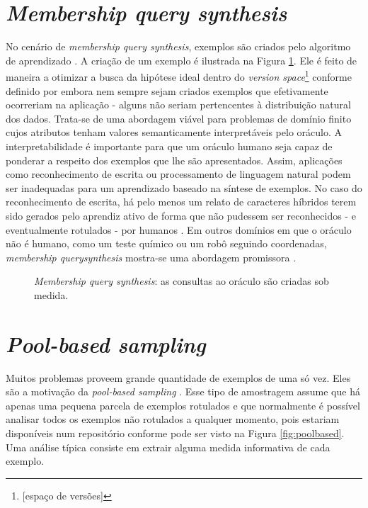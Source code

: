 \section*{\textit{Membership query synthesis}}

No cenário de \textit{membership query synthesis}, exemplos são criados pelo
algoritmo de aprendizado \citep{angluin1988queries}.
A criação de um exemplo é ilustrada na Figura \ref{fig:memquerysyn}.
Ele é feito de maneira a otimizar a busca da hipótese ideal dentro do
\textit{version space}\footnote{[espaço de versões]} conforme definido por
\cite{mitchell1997machine} embora nem
sempre sejam criados exemplos que efetivamente ocorreriam na aplicação - alguns não seriam
pertencentes à distribuição natural dos dados.
Trata-se de uma abordagem viável para problemas de domínio finito cujos atributos tenham valores
semanticamente interpretáveis pelo oráculo.
A interpretabilidade é importante para que um oráculo humano seja capaz de ponderar a respeito
dos
exemplos que lhe são apresentados.
Assim, aplicações como reconhecimento de escrita ou processamento de linguagem natural podem ser
inadequadas para um aprendizado baseado na síntese de exemplos.
No caso do reconhecimento de escrita, há pelo menos um relato de caracteres híbridos terem sido
gerados pelo aprendiz ativo de forma que não pudessem ser reconhecidos - e eventualmente
rotulados
- por humanos \citep{settles2010active,baum1992query}. Em outros domínios em que o oráculo não é
humano, como um teste químico ou um robô seguindo coordenadas, \textit{membership querysynthesis}
mostra-se uma abordagem promissora \citep{cohn1996active}.

\begin{figure} %
    \centering
    \scalebox{.75}{}
    \caption{\textit{Membership query synthesis}: as consultas ao oráculo são criadas sob medida.}
    \label{fig:memquerysyn}
\end{figure}

\section*{\textit{Pool-based sampling}}
Muitos problemas proveem grande quantidade de exemplos de uma só vez. Eles são a motivação da
\textit{pool-based sampling} \citep{lewis1994heterogeneous}.
Esse tipo de amostragem assume que há apenas uma pequena parcela de exemplos rotulados e que
normalmente é possível analisar todos os exemplos não rotulados a qualquer momento, pois estariam
disponíveis num repositório conforme pode ser visto na Figura \ref{fig:poolbased}.
Uma análise típica consiste em extrair alguma medida informativa de cada exemplo.

